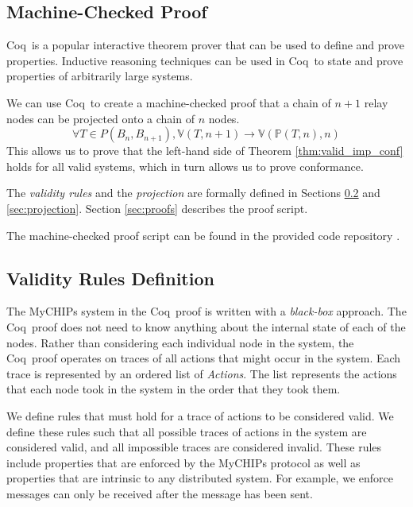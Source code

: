 \documentclass[runningheads]{llncs}
\newcommand{\actsvalid}[2]{\mathds{V}(#1, #2)}
\newcommand{\projectsize}[2]{\mathds{P}(#1, #2)}
\newcommand{\secref}[1]{Section \ref{#1}}
\newcommand{\coq}{Coq}
\newcommand{\coderepository}{provided code repository \cite{Storey_Extending_Model_Checking_2023}}
\newif\ifcomments
\newif\ifkylecomments
\newcommand{\egm}[1]{\ifcomments\textcolor{orange}{egm: #1}\fi}
\newcommand{\krs}[1]{\ifkylecomments\textcolor{blue}{krs: #1}\fi}
\begin{document}
\subsection{Machine-Checked Proof}
\coq\ is a popular interactive theorem prover that can be used to define and prove properties. Inductive reasoning techniques can be used in \coq\ to state and prove properties of arbitrarily large systems. 

We can use \coq\ to create a machine-checked proof that a chain of $n+1$ relay nodes can be projected onto a chain of $n$ nodes.
\begin{equation}
\label{eq:larger_smaller_valid}
\forall T \in P(B_n, B_{n+1}), 
\actsvalid{T}{n+1} \longrightarrow
\actsvalid{\projectsize{T}{n}}{n}
\end{equation}
This allows us to prove that the left-hand side of Theorem \ref{thm:valid_imp_conf} holds for all valid systems, which in turn allows us to prove conformance.
\krs{Just a short blurb, but does this help? \egm{The above is confusing the context of the larger proof because it is going from $n + 1$ to $n$. Need some text to help understand.}}

The \emph{validity rules} and the \emph{projection} are formally defined in Sections \ref{sec:definitions} and \ref{sec:projection}. \secref{sec:proofs} describes the proof script.

The machine-checked proof script can be found in the \coderepository.

\subsection{Validity Rules Definition} \label{sec:definitions}
The MyCHIPs system in the \coq\ proof is written with a \emph{black-box} approach. The \coq\ proof does not need to know anything about the internal state of each of the nodes. Rather than considering each individual node in the system, the \coq\ proof operates on traces of all actions that might occur in the system. Each trace is represented by an ordered list of \emph{Actions}. The list represents the actions that each node took in the system in the order that they took them.

We define rules that must hold for a trace of actions to be considered valid. We define these rules such that all possible traces of actions in the system are considered valid, and all impossible traces are considered invalid. These rules include properties that are enforced by the MyCHIPs protocol as well as properties that are intrinsic to any distributed system. For example, we enforce  messages can only be received after the message has been sent.
\end{document}
